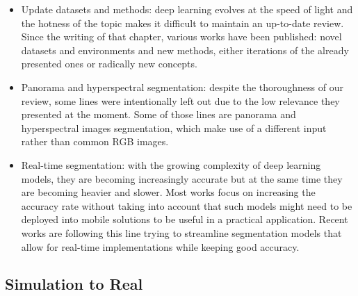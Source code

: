 \begin{itemize}
    \item Update datasets and methods: deep learning evolves at the speed of light and the hotness of the topic makes it difficult to maintain an up-to-date review. Since the writing of that chapter, various works have been published: novel datasets and environments and new methods, either iterations of the already presented ones or radically new concepts.
    \item Panorama and hyperspectral segmentation: despite the thoroughness of our review, some lines were intentionally left out due to the low relevance they presented at the moment. Some of those lines are panorama and hyperspectral images segmentation, which make use of a different input rather than common \ac{RGB} images.
    \item Real-time segmentation: with the growing complexity of deep learning models, they are becoming increasingly accurate but at the same time they are becoming heavier and slower. Most works focus on increasing the accuracy rate without taking into account that such models might need to be deployed into mobile solutions to be useful in a practical application. Recent works are following this line trying to streamline segmentation models that allow for real-time implementations while keeping good accuracy.
\end{itemize}

\subsection{Simulation to Real}

